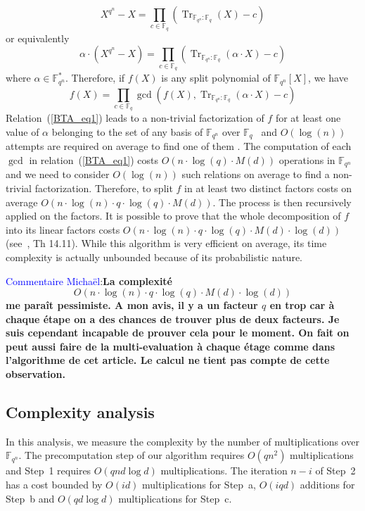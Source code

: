 \documentclass{sig-alternate}
\newcommand{\ff}[1]{\mathbb{F}_{#1}}
\newcommand{\fqn}{\ff{q^n}}
\newcommand{\qq}{q}
\newcommand{\nn}{n}
\newcommand{\qn}{{\qq^\nn}}
\newcommand{\basef}{\ff{\qq}}
\newcommand{\extf}{\ff{\qn}}
\DeclareMathOperator{\Tr}{Tr}
\newcommand{\trabs}[2]{\Tr_{#1:#2}}
\newcommand{\trextbase}{\trabs{\extf}{\basef}}
\newcommand{\bigO}{O}
\newcounter{algo}
\newcommand{\com }{\noindent \textcolor{blue}{Commentaire Micha\"el}:}
\begin{document}
$$X^{\qn}-X=\prod_{c \in \basef}   (\trextbase(X)-c)$$ 
or equivalently 
\begin{equation}
\label{BTA_eq0}
\alpha\cdot (X^{\qn}-X)=\prod_{c \in \basef}   (\trextbase(\alpha \cdot X)-c)
\end{equation}
where $\alpha \in \extf^\ast$. Therefore, if $f(X)$ is any split polynomial of $\extf[X]$, we have
\begin{equation}
\label{BTA_eq1}
f(X)=\prod_{c \in \basef} \gcd(f(X),\trextbase(\alpha \cdot X)-c)  
\end{equation}
Relation~(\ref{BTA_eq1}) leads to a non-trivial factorization of $f$ for at least one value of $\alpha$ 
belonging to the set of any basis of $\extf$ over $\basef$~\cite{berl70}  and $\bigO(\log(n))$ attempts are required on average to find one of them \cite{Menvanovans92}. The computation of each $\gcd$ in relation~(\ref{BTA_eq1}) costs $\bigO(n \cdot \log(q) \cdot M(d))$ operations in $\extf$ and we need to consider $\bigO(\log(n))$ such relations on average to find a non-trivial factorization. Therefore, 
 to split $f$ in at least two distinct factors costs on average $\bigO(n \cdot \log(n) \cdot  q \cdot \log(q) \cdot M(d))$. The process is then recursively applied on the factors. It is possible to prove that the whole decomposition of $f$ into its linear factors costs $\bigO(n  \cdot \log(n) \cdot q \cdot \log(q) \cdot M(d) \cdot \log(d))$ (see~\cite{Gathen2003}, Th 14.11). While this algorithm is very efficient on average, its time complexity is actually unbounded because of its probabilistic nature.
 

\begin{mycomment}
\com {\bf La complexit\'e 
$$\bigO(n  \cdot \log(n) \cdot q \cdot \log(q) \cdot M(d) \cdot \log(d))$$
me para\^it pessimiste. A mon avis, il y a un facteur $q$ en trop car \`a chaque \'etape on a des chances de trouver plus de deux facteurs. Je suis cependant incapable de prouver cela pour le moment. On fait on peut aussi faire de 
la multi-evaluation \`a chaque \'etage comme dans l'algorithme de cet article. Le calcul ne tient pas compte de cette observation.
}
\end{mycomment}




\subsection{Complexity analysis}

In this analysis, we measure the complexity by the number of multiplications over $\fqn$. 
%
The precomputation step of our algorithm requires $O(qn^2)$ multiplications and Step~1 requires $O(qnd\log d)$ multiplications. The iteration $n-i$ of Step~2 has a cost bounded by $O(id)$ multiplications for Step~a, $O(iqd)$ additions for Step~b and $O(qd\log d)$ multiplications for Step~c. 
\end{document}
